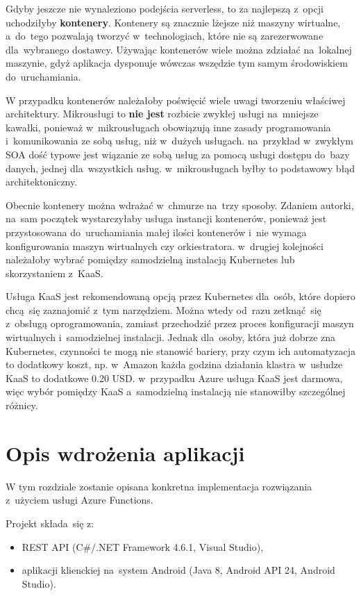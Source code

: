 \documentclass[12pt,a4paper,twoside,titlepage,openright]{book}
\begin{document}
Gdyby jeszcze nie wynaleziono podejścia serverless, to za najlepszą z~opcji uchodziłyby \textbf{kontenery}. Kontenery są znacznie lżejsze niż maszyny wirtualne, a~do~tego pozwalają tworzyć w~technologiach, które nie są zarezerwowane dla~wybranego dostawcy. Używając kontenerów wiele można zdziałać na~lokalnej maszynie, gdyż aplikacja dysponuje wówczas wszędzie tym samym środowiskiem do~uruchamiania. 

W przypadku kontenerów należałoby poświęcić wiele uwagi tworzeniu właściwej architektury. Mikrousługi to \textbf{nie jest} rozbicie zwykłej usługi na~mniejsze kawałki, ponieważ w~mikrousługach obowiązują inne zasady programowania i~komunikowania ze sobą usług, niż w~dużych usługach. na~przykład w~zwykłym SOA dość typowe jest wiązanie ze sobą usług za pomocą usługi dostępu do~bazy danych, jednej dla~wszystkich usług. w~mikrousługach byłby to podstawowy błąd architektoniczny. 

Obecnie kontenery można wdrażać w~chmurze na~trzy sposoby. Zdaniem autorki, na~sam początek wystarczyłaby usługa instancji kontenerów, ponieważ jest przystosowana do~uruchamiania małej ilości kontenerów i~nie wymaga konfigurowania maszyn wirtualnych czy orkiestratora. w~drugiej kolejności należałoby wybrać pomiędzy samodzielną instalacją Kubernetes lub skorzystaniem z~KaaS. 

Usługa KaaS jest rekomendowaną opcją przez Kubernetes dla~osób, które dopiero chcą~się zaznajomić z~tym narzędziem. Można wtedy od~razu zetknąć~się z~obsługą oprogramowania, zamiast przechodzić przez proces konfiguracji maszyn wirtualnych i~samodzielnej instalacji. Jednak dla~osoby, która już dobrze zna Kubernetes, czynności te mogą nie stanowić bariery, przy czym ich automatyzacja to dodatkowy koszt, np. w~Amazon każda godzina działania klastra w~usłudze KaaS to dodatkowe 0.20 USD. w~przypadku Azure usługa KaaS jest darmowa, więc wybór pomiędzy KaaS a~samodzielną instalacją nie stanowiłby szczególnej różnicy.



\chapter{Opis wdrożenia aplikacji}

W tym rozdziale zostanie opisana konkretna implementacja rozwiązania z~użyciem usługi Azure Functions.

Projekt składa~się z:
\begin{itemize}
\item REST API (C\#/.NET Framework 4.6.1, Visual Studio),
\item aplikacji klienckiej na~system Android (Java 8, Android API 24, Android Studio).
\end{itemize}
\end{document}
